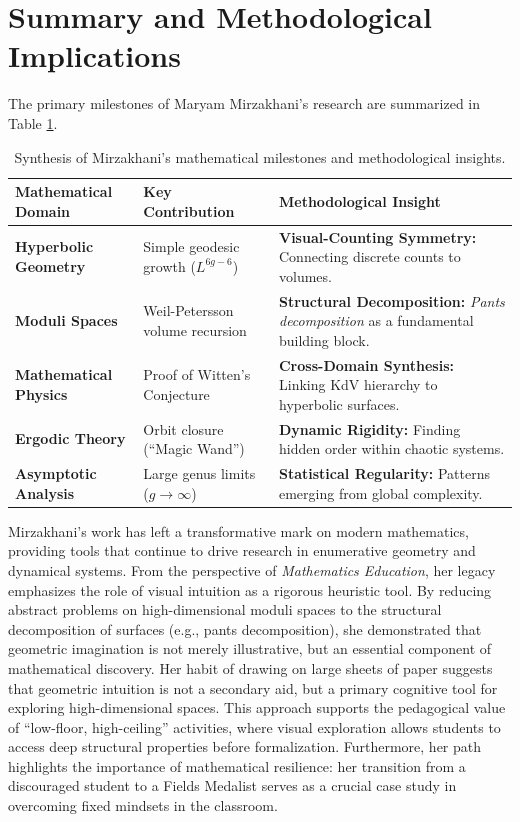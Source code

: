 \section{Summary and Methodological Implications}

The primary milestones of Maryam Mirzakhani's research are summarized in Table \ref{tab:mirzakhani_results}.



\begin{table}[htbp]
\centering
\caption{Synthesis of Mirzakhani's mathematical milestones and methodological insights.}
\label{tab:mirzakhani_results}
\vspace{0.3cm}
\small
\renewcommand{\arraystretch}{2}
\begin{tabular}{|>{\centering\arraybackslash}m{3.9cm}|>{\centering\arraybackslash}m{4.3cm}|>{\centering\arraybackslash}m{5cm}|} 
\hline
\textbf{Mathematical Domain} & \textbf{Key Contribution} & \textbf{Methodological Insight} \\ 
\hline
\textbf{Hyperbolic Geometry} & Simple geodesic growth ($L^{6g-6}$) & \textbf{Visual-Counting Symmetry:} Connecting discrete counts to volumes. \\ 
\hline
\textbf{Moduli Spaces} & Weil-Petersson volume recursion & \textbf{Structural Decomposition:} \textit{Pants decomposition} as a fundamental building block. \\ 
\hline
\textbf{Mathematical Physics} & Proof of Witten's Conjecture & \textbf{Cross-Domain Synthesis:} Linking KdV hierarchy to hyperbolic surfaces. \\ 
\hline
\textbf{Ergodic Theory} & Orbit closure (``Magic Wand'') & \textbf{Dynamic Rigidity:} Finding hidden order within chaotic systems. \\ 
\hline
\textbf{Asymptotic Analysis} & Large genus limits ($g \to \infty$) & \textbf{Statistical Regularity:} Patterns emerging from global complexity. \\ 
\hline
\end{tabular}
\end{table}

Mirzakhani's work has left a transformative mark on modern mathematics, providing tools that continue to drive research in enumerative geometry and dynamical systems. From the perspective of \textit{Mathematics Education}, her legacy emphasizes the role of visual intuition as a rigorous heuristic tool. By reducing abstract problems on high-dimensional moduli spaces to the structural decomposition of surfaces (e.g., pants decomposition), she demonstrated that geometric imagination is not merely illustrative, but an essential component of mathematical discovery. 
Her habit of drawing on large sheets of paper suggests that geometric intuition is not a secondary aid, but a primary cognitive tool for exploring high-dimensional spaces. This approach supports the pedagogical value of ``low-floor, high-ceiling'' activities, where visual exploration allows students to access deep structural properties before formalization. Furthermore, her path highlights the importance of mathematical resilience: her transition from a discouraged student to a Fields Medalist serves as a crucial case study in overcoming fixed mindsets in the classroom.